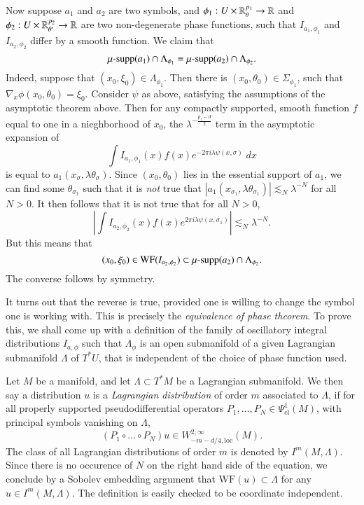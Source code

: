 Now suppose $a_1$ and $a_2$ are two symbols, and $\phi_1: U \times \operatorname{\mathbb{R}}^{p_1}_{\theta} \to \operatorname{\mathbb{R}}$ and $\phi_2: U \times \operatorname{\mathbb{R}}^{p_2}_{\theta'} \to \operatorname{\mathbb{R}}$ are two non-degenerate phase functions, such that $I_{a_1,\phi_1}$ and $I_{a_2, \phi_2}$ differ by a smooth function. We claim that
%
\[ \operatorname{\text{$\mu$-supp}}(a_1) \cap \Lambda_{\phi_1} = \operatorname{\text{$\mu$-supp}}(a_2) \cap \Lambda_{\phi_2}. \]
%
Indeed, suppose that $(x_0,\xi_0) \in \Lambda_{\phi_1}$. Then there is $(x_0,\theta_0) \in \Sigma_{\phi_1}$, such that $\nabla_x \phi(x_0,\theta_0) = \xi_0$. Consider $\psi$ as above, satisfying the assumptions of the asymptotic theorem above. Then for any compactly supported, smooth function $f$ equal to one in a nieghborhood of $x_0$, the $\lambda^{- \frac{p_1 - d}{2}}$ term in the asymptotic expansion of
%
\[ \int I_{a_1,\phi_1}(x) f(x) e^{-2 \pi i \lambda \psi(x,\sigma)}\; dx \]
%
is equal to $a_1(x_\sigma,\lambda \theta_\sigma)$. Since $(x_0, \theta_0)$ lies in the essential support of $a_1$, we can find some $\theta_{\sigma_1}$ such that it is \emph{not} true that $|a_1(x_{\sigma_1}, \lambda \theta_{\sigma_1})| \lesssim_N \lambda^{-N}$ for all $N > 0$. It then follows that it is not true that for all $N > 0$,
%
\[ \left| \int I_{a_2,\phi_2}(x) f(x) e^{2 \pi i \lambda \psi(x,\sigma_1)} \right| \lesssim_N \lambda^{-N}. \]
%
But this means that
%
\[ (x_0,\xi_0) \in \text{WF}(I_{a_2,\phi_2}) \subset \operatorname{\text{$\mu$-supp}}(a_2) \cap \Lambda_{\phi_2}. \]
%
The converse follows by symmetry.

It turns out that the reverse is true, provided one is willing to change the symbol one is working with. This is precisely the \emph{equivalence of phase theorem}. To prove this, we shall come up with a definition of the family of oscillatory integral distributions $I_{a,\phi}$ such that $\Lambda_\phi$ is an open submanifold of a given Lagrangian submanifold $\Lambda$ of $T^* U$, that is independent of the choice of phase function used.

Let $M$ be a manifold, and let $\Lambda \subset T^* M$ be a Lagrangian submanifold. We then say a distribution $u$ is a \emph{Lagrangian distribution} of order $m$ associated to $\Lambda$, if for all properly supported pseudodifferential operators $P_1,\dots,P_N \in \Psi^1_{\text{cl}}(M)$, with principal symbols vanishing on $\Lambda$,
%
\[ (P_1 \circ \dots \circ P_N) u \in W^{2,\infty}_{-m-d/4, \text{loc}}(M). \]
%
The class of all Lagrangian distributions of order $m$ is denoted by $I^m(M,\Lambda)$. Since there is no occurence of $N$ on the right hand side of the equation, we conclude by a Sobolev embedding argument that $\text{WF}(u) \subset \Lambda$ for any $u \in I^m(M,\Lambda)$. The definition is easily checked to be coordinate independent.

